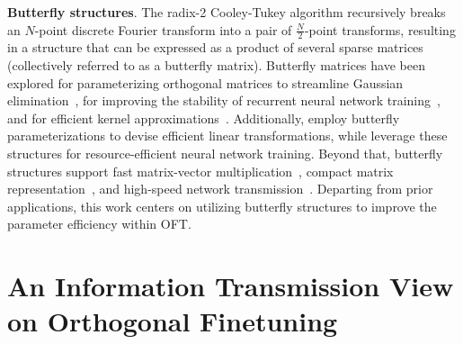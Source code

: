 \textbf{Butterfly structures}. The radix-2 Cooley-Tukey algorithm recursively breaks an $N$-point discrete Fourier transform into a pair of $\frac{N}{2}$-point transforms, resulting in a structure that can be expressed as a product of several sparse matrices (collectively referred to as a butterfly matrix). Butterfly matrices have been explored for parameterizing orthogonal matrices to streamline Gaussian elimination~\cite{parker1995random}, for improving the stability of recurrent neural network training~\cite{jing2017tunable}, and for efficient kernel approximations~\cite{munkhoeva2018quadrature}. Additionally, \cite{dao2019learning,dao2019kaleidoscope} employ butterfly parameterizations to devise efficient linear transformations, while \cite{chen2022pixelated,dao2022monarch} leverage these structures for resource-efficient neural network training. Beyond that, butterfly structures support fast matrix-vector multiplication~\cite{michielssen1996multilevel,o2010algorithm}, compact matrix representation~\cite{li2015butterfly}, and high-speed network transmission~\cite{klasing1994broadcasting,li2003linear,rajasingh2016transmission}. Departing from prior applications, this work centers on utilizing butterfly structures to improve the parameter efficiency within OFT.

\section{An Information Transmission View on Orthogonal Finetuning}

